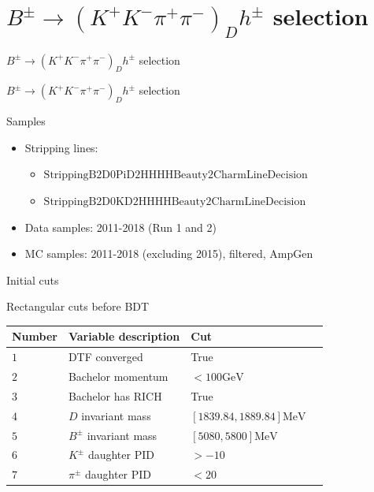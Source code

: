 \documentclass{beamer}
\begin{document}
\section{\texorpdfstring{$B^\pm\to(K^+K^-\pi^+\pi^-)_Dh^\pm$}{B to K+ K- pi+ pi- h} selection}
\begin{frame}{$B^\pm\to(K^+K^-\pi^+\pi^-)_Dh^\pm$ selection}
  \begin{center}
    {\huge $B^\pm\to(K^+K^-\pi^+\pi^-)_Dh^\pm$ selection}
  \end{center}
\end{frame}

\begin{frame}{Samples}
  \begin{itemize}
    \setlength\itemsep{1.2em}
    \item{Stripping lines:}
    \begin{itemize}
      \item{$\text{StrippingB2D0PiD2HHHHBeauty2CharmLineDecision}$}
      \item{$\text{StrippingB2D0KD2HHHHBeauty2CharmLineDecision}$}
    \end{itemize}
    \item{Data samples: 2011-2018 (Run 1 and 2)}
    \item{MC samples: 2011-2018 (excluding 2015), filtered, AmpGen}
  \end{itemize}
\end{frame}

\begin{frame}{Initial cuts}
  \begin{center}
    Rectangular cuts before BDT
  \end{center}
  \centering
  \def\arraystretch{1.2}%
  \begin{tabular}{lllc} 
    \hline
    Number & Variable description   & Cut \\
    \hline
    $1$    & DTF converged          & True \\
    $2$    & Bachelor momentum      & $< 100\si{\giga\eV}$ \\
    $3$    & Bachelor has RICH      & True \\
    $4$    & $D$ invariant mass     & $[1839.84, 1889.84]\si{\mega\eV}$ \\
    $5$    & $B^\pm$ invariant mass & $[5080, 5800]\si{\mega\eV}$ \\
    $6$    & $K^\pm$ daughter PID   & $> -10$ \\
    $7$    & $\pi^\pm$ daughter PID & $< 20$ \\
    \hline
  \end{tabular}
\end{frame}
\end{document}
